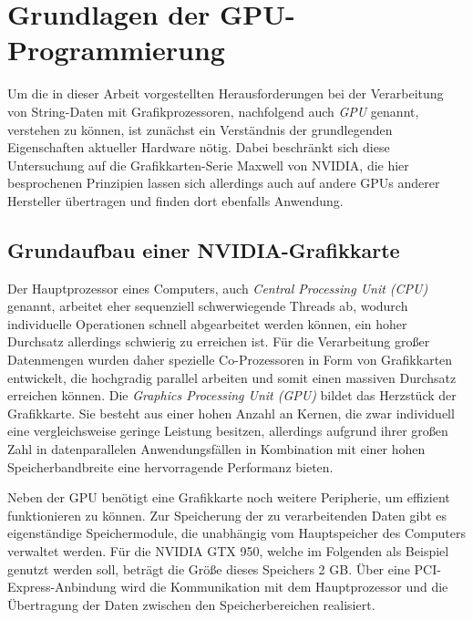 \chapter{Grundlagen der GPU-Programmierung}

Um die in dieser Arbeit vorgestellten Herausforderungen bei der Verarbeitung von String-Daten mit Grafikprozessoren, nachfolgend auch \emph{GPU} genannt, verstehen zu können, ist zunächst ein Verständnis der grundlegenden Eigenschaften aktueller Hardware nötig.
Dabei beschränkt sich diese Untersuchung auf die Grafikkarten-Serie Maxwell von NVIDIA, die hier besprochenen Prinzipien lassen sich allerdings auch auf andere GPUs anderer Hersteller übertragen und finden dort ebenfalls Anwendung.

\section{Grundaufbau einer NVIDIA-Grafikkarte}

Der Hauptprozessor eines Computers, auch \emph{Central Processing Unit (CPU)} genannt, arbeitet eher sequenziell schwerwiegende Threads ab, wodurch individuelle Operationen schnell abgearbeitet werden können, ein hoher Durchsatz allerdings schwierig zu erreichen ist.
Für die Verarbeitung großer Datenmengen wurden daher spezielle Co-Prozessoren in Form von Grafikkarten entwickelt, die hochgradig parallel arbeiten und somit einen massiven Durchsatz erreichen können.
Die \emph{Graphics Processing Unit (GPU)} bildet das Herzstück der Grafikkarte.
Sie besteht aus einer hohen Anzahl an Kernen, die zwar individuell eine vergleichsweise geringe Leistung besitzen, allerdings aufgrund ihrer großen Zahl in datenparallelen Anwendungsfällen in Kombination mit einer hohen Speicherbandbreite eine hervorragende Performanz bieten.

Neben der GPU benötigt eine Grafikkarte noch weitere Peripherie, um effizient funktionieren zu können.
Zur Speicherung der zu verarbeitenden Daten gibt es eigenständige Speichermodule, die unabhängig vom Hauptspeicher des Computers verwaltet werden.
Für die NVIDIA GTX 950, welche im Folgenden als Beispiel genutzt werden soll, beträgt die Größe dieses Speichers 2 GB.
Über eine PCI-Express-Anbindung wird die Kommunikation mit dem Hauptprozessor und die Übertragung der Daten zwischen den Speicherbereichen realisiert.

